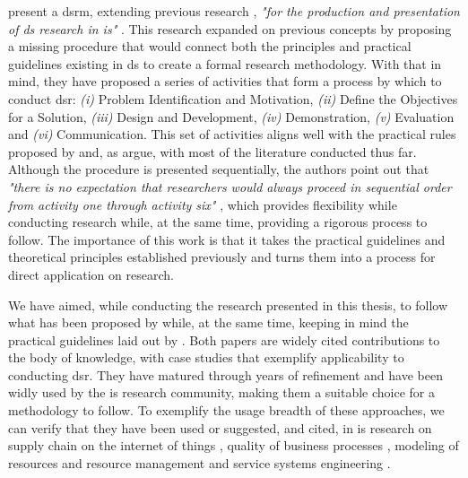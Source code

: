 \citeauthor{peffers_design_2007} \cite{peffers_design_2007} present a \gls{dsrm}, extending previous research \cite{march_design_1995, hevner_design_2004}, \textit{"for the production and presentation of \gls{ds} research in \gls{is}"} \cite[3]{peffers_design_2007}. This research expanded on previous concepts by proposing a missing procedure \cite[7]{peffers_design_2007} that would connect both the principles and practical guidelines existing in \gls{ds} to create a formal research methodology. With that in mind, they have proposed a series of activities that form a process by which to conduct \gls{dsr}: \emph{(i)} Problem Identification and Motivation, \emph{(ii)} Define the Objectives for a Solution, \emph{(iii)} Design and Development, \emph{(iv)} Demonstration, \emph{(v)} Evaluation and \emph{(vi)} Communication. This set of activities aligns well with the practical rules proposed by \citeauthor{hevner_design_2004} \cite{hevner_design_2004} and, as \citeauthor{peffers_design_2007} argue, with most of the literature conducted thus far. Although the procedure is presented sequentially, the authors point out that \textit{"there is no expectation that researchers would always proceed in sequential order from activity one through activity six"} \cite[14]{peffers_design_2007}, which provides flexibility while conducting research while, at the same time, providing a rigorous process to follow. The importance of this work is that it takes the practical guidelines and theoretical principles established previously and turns them into a process for direct application on research.

We have aimed, while conducting the research presented in this thesis, to follow what has been proposed by \citeauthor{peffers_design_2007} \cite{peffers_design_2007} while, at the same time, keeping in mind the practical guidelines laid out by \citeauthor{hevner_design_2004} \cite{hevner_design_2004}. Both papers are widely cited contributions to the body of knowledge, with case studies that exemplify applicability to conducting \gls{dsr}. They have matured through years of refinement and have been widly used by the \gls{is} research community, making them a suitable choice for a methodology to follow. To exemplify the usage breadth of these approaches, we can verify that they have been used or suggested, and cited, in \gls{is} research on supply chain on the internet of things \cite{geerts_supply_2014}, quality of business processes \cite{heidari_quality_2014}, modeling of resources and resource management \cite{speitkamp_mathematical_2010} and service systems engineering \cite{bohmann_service_2014}.

